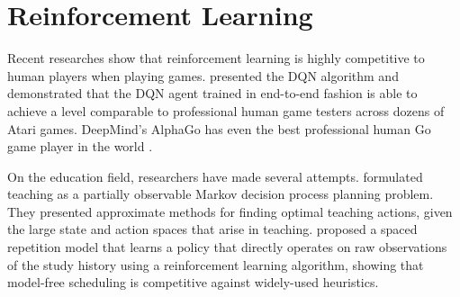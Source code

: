 \section{Reinforcement Learning}

    Recent researches show that reinforcement learning
    is highly competitive to human players when playing games.
    \textcite{mnih_human-level_2015} presented the DQN algorithm and demonstrated that
    the DQN agent trained in end-to-end fashion is able to achieve a level comparable to
    professional human game testers across dozens of Atari games.
    DeepMind's AlphaGo\cite{silver2016mastering}
    has even the best professional human Go game player in the world \cite{silver2017mastering}.

    On the education field, researchers have made several attempts.
    \textcite{rafferty2016faster} formulated teaching as a
    partially observable Markov decision process planning problem.
    They presented approximate methods for finding optimal teaching actions,
    given the large state and action spaces that arise in teaching.
    \textcite{reddy_accelerating_2017} proposed a spaced repetition model
    that learns a policy that directly operates on raw observations of the study history
    using a reinforcement learning algorithm,
    showing that model-free scheduling is competitive against widely-used heuristics.
















